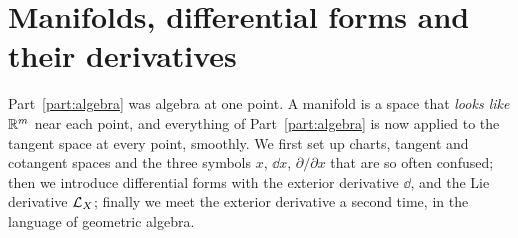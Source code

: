 \clearpage
\part{Manifolds, differential forms and their derivatives}\label{part:manifolds}

Part~\ref{part:algebra} was algebra at one point. A manifold is a space that \emph{looks like} $\mathbb{R}^m$ near each point, and
everything of Part~\ref{part:algebra} is now applied to the tangent space at every point, smoothly. We first set up charts,
tangent and cotangent spaces and the three symbols $x$, $\dd x$, $\partial/\partial x$ that are so often confused; then we
introduce differential forms with the exterior derivative $\dd$, and the Lie derivative $\mathcal{L}_X$; finally we meet the exterior
derivative a second time, in the language of geometric algebra.
